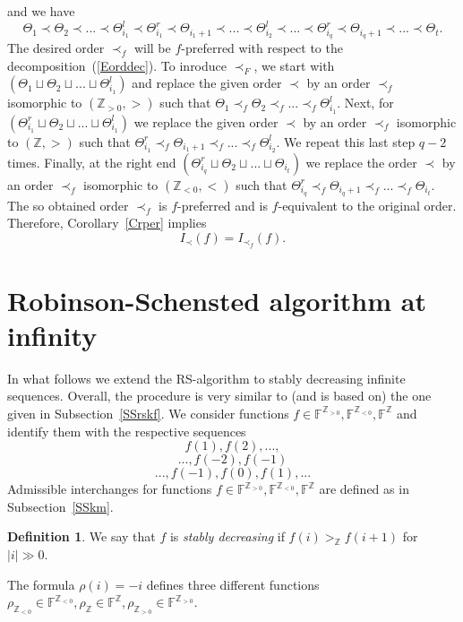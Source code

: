 \documentclass[10pt]{amsart}\oddsidemargin -1mm \evensidemargin -1mm \topmargin -15mm\headheight5mm \headsep 3.5mm \textheight 245mm\textwidth 170mm
\theoremstyle{definition}\newtheorem{theorem}{Theorem}[section]\newtheorem{lemma}[theorem]{Lemma}\newtheorem{remark}[theorem]{Remark}\newtheorem{proposition}[theorem]{Proposition}\newtheorem{corollary}[theorem]{Corollary}\newtheorem{definition}[theorem]{Definition}\newtheorem{Ex}[theorem]{Example}\newtheorem{obs}[theorem]{Observation}\newtheorem{nota}[theorem]{Notation}
\begin{document}
and we have
$$\Theta_1\prec \Theta_2\prec...\prec \Theta_{i_1}^l\prec \Theta_{i_1}^r\prec \Theta_{i_1+1}\prec... \prec \Theta_{i_2}^l \prec...\prec \Theta_{i_q}^r\prec \Theta_{i_q+1}\prec...\prec \Theta_t.$$
The desired order $\prec_f$ will be $f$-preferred with respect to the decomposition~(\ref{Eorddec}).
To inroduce $\prec_F$, we start with $(\Theta_1\sqcup \Theta_2\sqcup...\sqcup \Theta_{i_1}^l)$ and replace the given order $\prec$ by an order $\prec_f$ isomorphic to $(\mathbb Z_{>0}, >)$ such that $\Theta_1\prec_f \Theta_2\prec_f...\prec_f \Theta_{i_1}^l$. 
Next, for $(\Theta_{i_1}^r\sqcup \Theta_2\sqcup...\sqcup \Theta_{i_1}^l)$ we replace the given order $\prec$ by an order $\prec_f$ isomorphic to $(\mathbb Z, >)$ such that $\Theta_{i_1}^r\prec_f \Theta_{i_1+1}\prec_f...\prec_f \Theta_{i_2}^l$. 
We repeat this last step $q-2$ times. 
Finally, at the right end $(\Theta_{i_q}^r\sqcup \Theta_2\sqcup...\sqcup \Theta_{i_t})$ we replace the order $\prec$ by an order $\prec_f$ isomorphic to $(\mathbb Z_{<0}, <)$ such that $\Theta_{i_q}^r\prec_f \Theta_{i_q+1}\prec_f...\prec_f \Theta_{i_t}$. 
The so obtained order $\prec_f$ is $f$-preferred and is $f$-equivalent to the original order. 
Therefore, Corollary~\ref{Crper} implies $$I_{\prec}(f)=I_{\prec_f}(f).$$ 
\section{Robinson-Schensted algorithm at infinity}

In what follows we extend the RS-algorithm to stably decreasing infinite sequences. 
Overall, the procedure is very similar to (and is based on) the one given in Subsection~\ref{SSrskf}. 
We consider functions $f\in\mathbb F^{\mathbb Z_{>0}}, \mathbb F^{\mathbb Z_{<0}}, \mathbb F^{\mathbb Z}$ and identify them with the respective sequences  
$$f(1), f(2),...,$$
$$..., f(-2), f(-1)$$
$$ ..., f(-1), f(0), f(1),...$$
Admissible interchanges for functions $f\in \mathbb F^{\mathbb Z_{>0}}, \mathbb F^{\mathbb Z_{<0}}, \mathbb F^{\mathbb Z}$ are defined as in Subsection~\ref{SSkm}.
\begin{definition}We say that $f$ is {\it stably decreasing} if $f(i)>_\mathbb Zf(i+1)$ for $|i|\gg0$.\end{definition}
The formula $\rho(i)=-i$ defines three different functions $\rho_{\mathbb Z_{<0}}\in\mathbb F^{\mathbb Z_{<0}}, \rho_{\mathbb Z}\in\mathbb F^{\mathbb Z}, \rho_{\mathbb Z_{>0}}\in\mathbb F^{\mathbb Z_{>0}}.$ 
\end{document}
